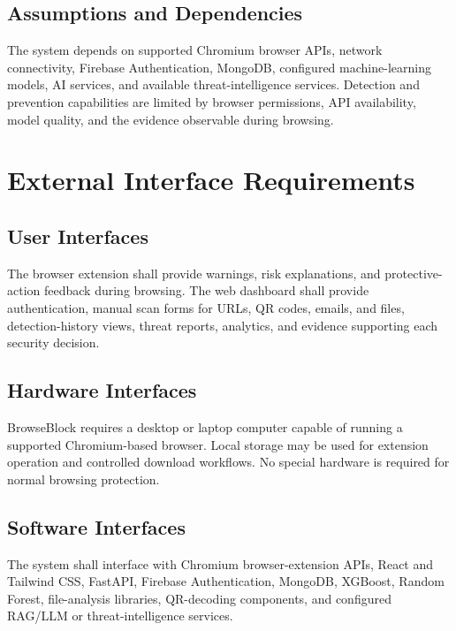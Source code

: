 \documentclass[12pt,a4paper]{report}
\begin{document}
\section{Assumptions and Dependencies}

The system depends on supported Chromium browser APIs, network connectivity, Firebase Authentication, MongoDB, configured machine-learning models, AI services, and available threat-intelligence services. Detection and prevention capabilities are limited by browser permissions, API availability, model quality, and the evidence observable during browsing.\par

\chapter{External Interface Requirements}

\section{User Interfaces}

The browser extension shall provide warnings, risk explanations, and protective-action feedback during browsing. The web dashboard shall provide authentication, manual scan forms for URLs, QR codes, emails, and files, detection-history views, threat reports, analytics, and evidence supporting each security decision.\par

\section{Hardware Interfaces}

BrowseBlock requires a desktop or laptop computer capable of running a supported Chromium-based browser. Local storage may be used for extension operation and controlled download workflows. No special hardware is required for normal browsing protection.\par

\section{Software Interfaces}

The system shall interface with Chromium browser-extension APIs, React and Tailwind CSS, FastAPI, Firebase Authentication, MongoDB, XGBoost, Random Forest, file-analysis libraries, QR-decoding components, and configured RAG/LLM or threat-intelligence services.\par
\end{document}
